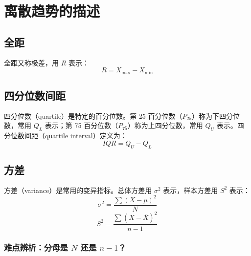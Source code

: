 \documentclass[lang=cn,10pt]{elegantbook}
\begin{document}
\section{离散趋势的描述}
\subsection{全距}

全距又称极差，用 $R$ 表示：
\begin{equation}
R=X_{\max}-X_{\min}
\end{equation}

\subsection{四分位数间距}

四分位数（quartile）是特定的百分位数。第 25 百分位数（$P_{25}$）称为下四分位数，常用 $Q_L$ 表示；第 75 百分位数（$P_{75}$）称为上四分位数，常用 $Q_U$ 表示。四分位数间距（quartile interval）定义为：
\begin{equation}
IQR=Q_U-Q_L
\end{equation}

\subsection{方差}

方差（variance）是常用的变异指标。总体方差用 $\sigma^2$ 表示，样本方差用 $S^2$ 表示：
\begin{equation}
\sigma^2=\frac{\sum (X-\mu)^2}{N}
\end{equation}
\begin{equation}
S^2=\frac{\sum (X-\overline{X})^2}{n-1}
\end{equation}

\subsubsection{难点辨析：分母是 $N$ 还是 $n-1$？}
\end{document}
